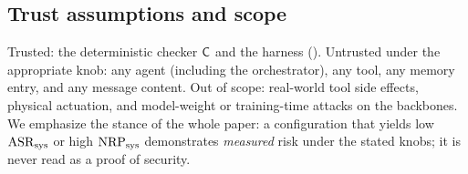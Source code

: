 \subsection{Trust assumptions and scope}
Trusted: the deterministic checker $\mathsf{C}$ and the harness (). Untrusted
under the appropriate knob: any agent (including the orchestrator), any tool, any memory
entry, and any message content. Out of scope: real-world tool side effects, physical
actuation, and model-weight or training-time attacks on the backbones. We emphasize the
stance of the whole paper: a configuration that yields low $\mathrm{ASR}_{\mathrm{sys}}$ or high $\mathrm{NRP}_{\mathrm{sys}}$
demonstrates \emph{measured} risk under the stated knobs; it is never read as a proof of
security.

